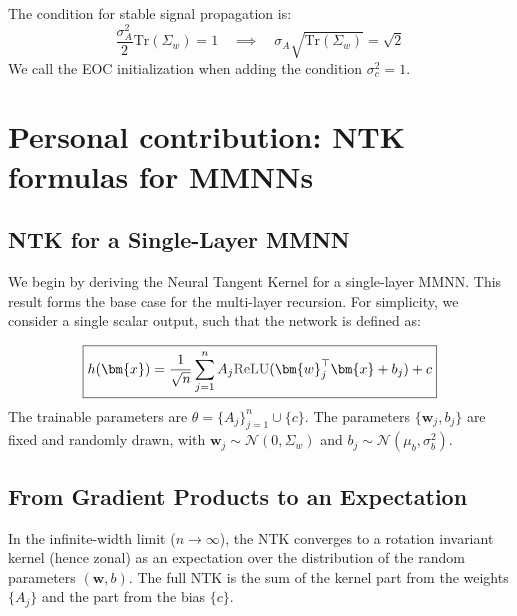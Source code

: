 \documentclass[a4paper]{article}
\newcommand{\ReLU}{\textcolor{relucolor}{\text{ReLU}}}
\DeclareRobustCommand{\ReLU}{\mathrel{\text{%
    \begin{tikzpicture}[baseline=(current bounding box.south)]
        \draw[thick] (0,0) -- (0.25,0) -- (0.4,0.25);
    \end{tikzpicture}}}\!\!}
\theoremstyle{plain}
\theoremstyle{definition}
\theoremstyle{remark}
\begin{document}
\begin{tcolorbox}[colback=red!15,colframe=red!80!black,title={\textbf{Edge of Chaos Condition}},enhanced,drop shadow,boxrule=2pt]

The condition for stable signal propagation is:
\begin{equation}
    \frac{\sigma_A^2}{2} \text{Tr}(\Sigma_w) = 1 \quad \implies \quad \sigma_A \sqrt{\text{Tr}(\Sigma_w)} = \sqrt{2}
\end{equation}
We call the EOC initialization when adding the condition $\sigma_c^2 =1$.
\end{tcolorbox}







\section{Personal contribution: NTK formulas for MMNNs}

\subsection{NTK for a Single-Layer MMNN}
\label{sec:single_layer_mmfn}
We begin by deriving the Neural Tangent Kernel for a single-layer MMNN. This result forms the base case for the multi-layer recursion. For simplicity, we consider a single scalar output, such that the network is defined as:

\begin{tcolorbox}[colback=yellow!10,colframe=yellow!80!black,title={\textbf{Single-Layer MMNN Definition}},enhanced,drop shadow,boxrule=2pt]
\begin{equation}
    \boxed{h(\bm{x}) = \frac{1}{\sqrt{n}} \sum_{j=1}^n A_j \ReLU(\bm{w}_j^\top \bm{x} + b_j) + c}
\end{equation}
The trainable parameters are $\theta = \{A_j\}_{j=1}^n \cup \{c\}$. The parameters $\{\bm{w}_j, b_j\}$ are fixed and randomly drawn, with $\bm{w}_j \sim \mathcal{N}(0, \Sigma_w)$ and $b_j \sim \mathcal{N}(\mu_b, \sigma_b^2)$.
\end{tcolorbox}

\subsection{From Gradient Products to an Expectation}
In the infinite-width limit ($n \to \infty$), the NTK converges to a rotation invariant kernel (hence zonal) as an expectation over the distribution of the random parameters $(\bm{w}, b)$. The full NTK is the sum of the kernel part from the weights $\{A_j\}$ and the part from the bias $\{c\}$.
\end{document}
